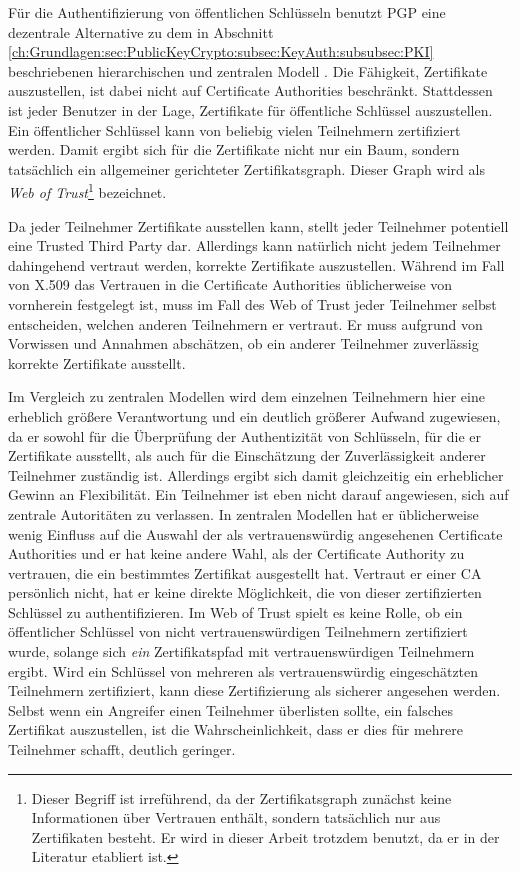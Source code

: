 Für die Authentifizierung von öffentlichen Schlüsseln benutzt
PGP eine dezentrale Alternative zu dem in Abschnitt
\ref{ch:Grundlagen:sec:PublicKeyCrypto:subsec:KeyAuth:subsubsec:PKI}
beschriebenen hierarchischen und zentralen
Modell \cite{Ashley1999}. Die Fähigkeit, Zertifikate auszustellen,
ist dabei nicht auf Certificate Authorities beschränkt. Stattdessen
ist jeder Benutzer in der Lage, Zertifikate für öffentliche
Schlüssel auszustellen. Ein öffentlicher Schlüssel kann von
beliebig vielen Teilnehmern zertifiziert werden. Damit ergibt sich
für die Zertifikate nicht nur ein Baum, sondern tatsächlich ein
allgemeiner gerichteter Zertifikatsgraph. Dieser Graph wird als
\emph{Web of Trust}\footnote{Dieser Begriff ist irreführend, da der
  Zertifikatsgraph zunächst keine Informationen über Vertrauen
  enthält, sondern tatsächlich nur aus Zertifikaten besteht. Er
  wird in dieser Arbeit trotzdem benutzt, da er in der Literatur
  etabliert ist.} bezeichnet.

Da jeder Teilnehmer Zertifikate ausstellen kann, stellt jeder
Teilnehmer potentiell eine Trusted Third Party dar. Allerdings kann
natürlich nicht jedem Teilnehmer dahingehend vertraut werden,
korrekte Zertifikate auszustellen. Während im Fall von X.509 das
Vertrauen in die Certificate Authorities üblicherweise von
vornherein festgelegt ist, muss im Fall des Web of Trust jeder
Teilnehmer selbst entscheiden, welchen anderen Teilnehmern er
vertraut. Er muss aufgrund von Vorwissen und Annahmen abschätzen, ob
ein anderer Teilnehmer zuverlässig korrekte Zertifikate
ausstellt. 

Im Vergleich zu zentralen Modellen wird dem einzelnen Teilnehmern hier
eine erheblich größere Verantwortung und ein deutlich größerer
Aufwand zugewiesen, da er sowohl für die Überprüfung der
Authentizität von Schlüsseln, für die er Zertifikate ausstellt,
als auch für die Einschätzung der Zuverlässigkeit anderer
Teilnehmer zuständig ist. Allerdings ergibt sich damit gleichzeitig
ein erheblicher Gewinn an Flexibilität. Ein Teilnehmer ist eben
nicht darauf angewiesen, sich auf zentrale Autoritäten zu
verlassen. In zentralen Modellen hat er üblicherweise wenig Einfluss
auf die Auswahl der als vertrauenswürdig angesehenen Certificate
Authorities und er hat keine andere Wahl, als der Certificate
Authority zu vertrauen, die ein bestimmtes Zertifikat ausgestellt
hat. Vertraut er einer CA persönlich nicht, hat er keine direkte
Möglichkeit, die von dieser zertifizierten Schlüssel zu
authentifizieren. Im Web of Trust spielt es keine Rolle, ob ein
öffentlicher Schlüssel von nicht vertrauenswürdigen Teilnehmern
zertifiziert wurde, solange sich \emph{ein} Zertifikatspfad mit
vertrauenswürdigen Teilnehmern ergibt. Wird ein Schlüssel von
mehreren als vertrauenswürdig eingeschätzten Teilnehmern
zertifiziert, kann diese Zertifizierung als sicherer angesehen
werden. Selbst wenn ein Angreifer einen Teilnehmer überlisten
sollte, ein falsches Zertifikat auszustellen, ist die
Wahrscheinlichkeit, dass er dies für mehrere Teilnehmer schafft,
deutlich geringer.

